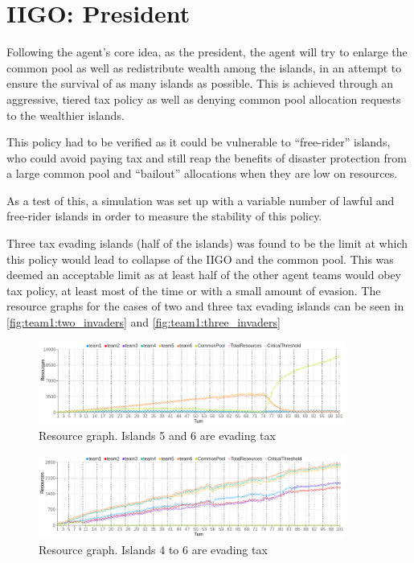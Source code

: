 \section{IIGO: President}

Following the agent's core idea, as the president, the agent will try to enlarge the common pool as well as redistribute wealth among the islands, in an attempt to ensure the survival of as many islands as possible. This is achieved through an aggressive, tiered tax policy as well as denying common pool allocation requests to the wealthier islands.

This policy had to be verified as it could be vulnerable to ``free-rider'' islands, who could avoid paying tax and still reap the benefits of disaster protection from a large common pool and ``bailout'' allocations when they are low on resources.

As a test of this, a simulation was set up with a variable number of lawful and free-rider islands in order to measure the stability of this policy.

Three tax evading islands (half of the islands) was found to be the limit at which this policy would lead to collapse of the IIGO and the common pool. This was deemed an acceptable limit as at least half of the other agent teams would obey tax policy, at least most of the time or with a small amount of evasion. The resource graphs for the cases of two and three tax evading islands can be seen in \autoref{fig:team1:two_invaders} and \autoref{fig:team1:three_invaders}

\begin{figure}[H]
\centering
\includegraphics[width=0.9\textwidth]{09_team1_agentdesign/images/two_invaders}
\caption{Resource graph. Islands 5 and 6 are evading tax}
\label{fig:team1:two_invaders}
\end{figure}

\begin{figure}[H]
\centering
\includegraphics[width=0.9\textwidth]{09_team1_agentdesign/images/three_invaders}
\caption{Resource graph. Islands 4 to 6 are evading tax}
\label{fig:team1:three_invaders}
\end{figure}

